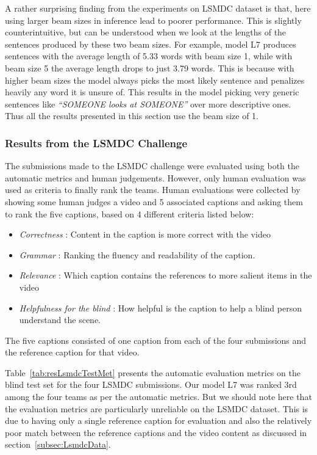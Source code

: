 A rather surprising finding from the experiments on LSMDC dataset is that, here
using larger beam sizes in inference lead to poorer performance.
This is slightly counterintuitive, but can be understood when we look at the
lengths of the sentences produced by these two beam sizes. 
For example, model L7 produces sentences with the average length of 5.33 words
with beam size 1, while with beam size 5 the average length drops to just 3.79
words. 
This is because with higher beam sizes the model always picks the most likely
sentence and penalizes heavily any word it is unsure of.
This results in the model picking very generic sentences like \emph{``SOMEONE
looks at SOMEONE''} over more descriptive ones.
Thus all the results presented in this section use the beam size of 1.

\subsubsection{Results from the LSMDC Challenge}
\label{subsec:LSMDCChall}
The submissions made to the LSMDC challenge were evaluated using both the
automatic metrics and human judgements.
However, only human evaluation was used as criteria to finally rank the teams.
Human evaluations were collected by showing some human judges a video and 5
associated captions and asking them to rank the five captions, based on 4
different criteria listed below:
\begin{itemize}
  \item \emph{Correctness} : Content in the caption is more correct with the video 
  \item \emph{Grammar} : Ranking the fluency and readability of the caption. 
  \item \emph{Relevance} : Which caption contains the references to more salient items in the video
  \item \emph{Helpfulness for the blind} : How helpful is the caption to help a
          blind person understand the scene.
\end{itemize}
The five captions consisted of one caption from each of the four submissions and
the reference caption for that video.

Table~\ref{tab:resLsmdcTestMet} presents the automatic evaluation metrics on the
blind test set for the four LSMDC submissions.
Our model L7 was ranked 3rd among the four teams as per the automatic metrics.
But we should note here that the evaluation metrics are particularly unreliable
on the LSMDC dataset.
This is due to having only a single reference caption for evaluation and also
the relatively poor match between the reference captions and the video content
as discussed in section~\ref{subsec:LsmdcData}.

